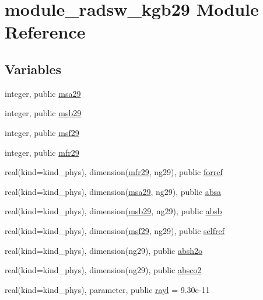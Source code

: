 \hypertarget{namespacemodule__radsw__kgb29}{}\section{module\+\_\+radsw\+\_\+kgb29 Module Reference}
\label{namespacemodule__radsw__kgb29}
\subsection*{Variables}
\begin{DoxyCompactItemize}
\item 
integer, public \hyperlink{namespacemodule__radsw__kgb29_adbee6e5d3b3efc437ff8815e42962b92}{msa29}
\item 
integer, public \hyperlink{group__module__radsw__main_gadd8e18a273d5fa133f22fb47c4d722da}{msb29}
\item 
integer, public \hyperlink{group__module__radsw__main_gace849342fcb0d18d825318a2ee26ce0e}{msf29}
\item 
integer, public \hyperlink{group__module__radsw__main_ga866ce18e53b84d75d51dd8c6a999ee7b}{mfr29}
\item 
real(kind=kind\+\_\+phys), dimension(\hyperlink{group__module__radsw__main_ga866ce18e53b84d75d51dd8c6a999ee7b}{mfr29}, ng29), public \hyperlink{group__module__radsw__main_ga6e4d495b4588d3c794047e71497661a0}{forref}
\item 
real(kind=kind\+\_\+phys), dimension(\hyperlink{namespacemodule__radsw__kgb29_adbee6e5d3b3efc437ff8815e42962b92}{msa29}, ng29), public \hyperlink{group__module__radsw__main_ga1132fd19edc0312f6bcc905619f3bdfd}{absa}
\item 
real(kind=kind\+\_\+phys), dimension(\hyperlink{group__module__radsw__main_gadd8e18a273d5fa133f22fb47c4d722da}{msb29}, ng29), public \hyperlink{group__module__radsw__main_gac9fb794bc4e4a02964b5e5d1431c31c3}{absb}
\item 
real(kind=kind\+\_\+phys), dimension(\hyperlink{group__module__radsw__main_gace849342fcb0d18d825318a2ee26ce0e}{msf29}, ng29), public \hyperlink{group__module__radsw__main_ga468e2dd6001734d10784c8fb7b5df4e3}{selfref}
\item 
real(kind=kind\+\_\+phys), dimension(ng29), public \hyperlink{group__module__radsw__main_gacab70725ca7faf002f04306fe1798e02}{absh2o}
\item 
real(kind=kind\+\_\+phys), dimension(ng29), public \hyperlink{group__module__radsw__main_gaa9a57e32dfbb8979478aa8c931ff0e2d}{absco2}
\item 
real(kind=kind\+\_\+phys), parameter, public \hyperlink{group__module__radsw__main_gabc0a41a10d73674e124115fe0511cc23}{rayl} = 9.\+30e-\/11
\end{DoxyCompactItemize}


